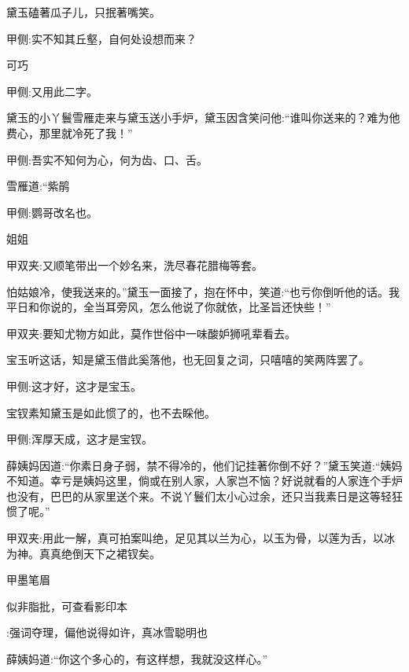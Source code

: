 \begin{parag}
    黛玉磕著瓜子儿，只抿著嘴笑。\begin{note}甲侧:实不知其丘壑，自何处设想而来？\end{note}可巧\begin{note}甲侧:又用此二字。\end{note}黛玉的小丫鬟雪雁走来与黛玉送小手炉，黛玉因含笑问他:“谁叫你送来的？难为他费心，那里就冷死了我！”\begin{note}甲侧:吾实不知何为心，何为齿、口、舌。\end{note}雪雁道:“紫鹃\begin{note}甲侧:鹦哥改名也。\end{note}姐姐\begin{note}甲双夹:又顺笔带出一个妙名来，洗尽春花腊梅等套。\end{note}怕姑娘冷，使我送来的。”黛玉一面接了，抱在怀中，笑道:“也亏你倒听他的话。我平日和你说的，全当耳旁风，怎么他说了你就依，比圣旨还快些！”\begin{note}甲双夹:要知尤物方如此，莫作世俗中一味酸妒狮吼辈看去。\end{note}宝玉听这话，知是黛玉借此奚落他，也无回复之词，只嘻嘻的笑两阵罢了。\begin{note}甲侧:这才好，这才是宝玉。\end{note}宝钗素知黛玉是如此惯了的，也不去睬他。\begin{note}甲侧:浑厚天成，这才是宝钗。\end{note}薛姨妈因道:“你素日身子弱，禁不得冷的，他们记挂著你倒不好？”黛玉笑道:“姨妈不知道。幸亏是姨妈这里，倘或在别人家，人家岂不恼？好说就看的人家连个手炉也没有，巴巴的从家里送个来。不说丫鬟们太小心过余，还只当我素日是这等轻狂惯了呢。”\begin{note}甲双夹:用此一解，真可拍案叫绝，足见其以兰为心，以玉为骨，以莲为舌，以冰为神。真真绝倒天下之裙钗矣。\end{note}\begin{note}甲墨笔眉\begin{subnote}似非脂批，可查看影印本\end{subnote}:强词夺理，偏他说得如许，真冰雪聪明也\end{note}薛姨妈道:“你这个多心的，有这样想，我就没这样心。”
\end{parag}


